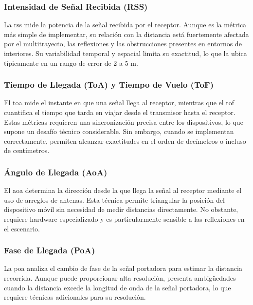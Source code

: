 \subsubsection{Intensidad de Señal Recibida (RSS)}

La \gls{rss} mide la potencia de la señal recibida por el receptor. Aunque es la métrica más simple de implementar, su relación con la distancia está fuertemente afectada por el multitrayecto, las reflexiones y las obstrucciones presentes en entornos de interiores. Su variabilidad temporal y espacial limita su exactitud, lo que la ubica típicamente en un rango de error de 2 a 5 m.

\subsubsection{Tiempo de Llegada (ToA) y Tiempo de Vuelo (ToF)}

El \gls{toa} mide el instante en que una señal llega al receptor, mientras que el \gls{tof} cuantifica el tiempo que tarda en viajar desde el transmisor hasta el receptor. Estas métricas requieren una sincronización precisa entre los dispositivos, lo que supone un desafío técnico considerable. Sin embargo, cuando se implementan correctamente, permiten alcanzar exactitudes en el orden de decímetros o incluso de centímetros.

\subsubsection{Ángulo de Llegada (AoA)}

El \gls{aoa} determina la dirección desde la que llega la señal al receptor mediante el uso de arreglos de antenas. Esta técnica permite triangular la posición del dispositivo móvil sin necesidad de medir distancias directamente. No obstante, requiere hardware especializado y es particularmente sensible a las reflexiones en el escenario.

\subsubsection{Fase de Llegada (PoA)}

La \gls{poa} analiza el cambio de fase de la señal portadora para estimar la distancia recorrida. Aunque puede proporcionar alta resolución, presenta ambigüedades cuando la distancia excede la longitud de onda de la señal portadora, lo que requiere técnicas adicionales para su resolución.

